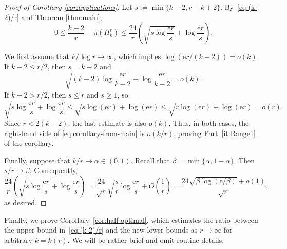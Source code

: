 \documentclass[10pt,a4paper]{article}
\numberwithin{equation}{section}
\theoremstyle{definition}
\theoremstyle{remark}
\newcommand{\hide}[1]{{\color{DarkGreen}#1}}
\renewcommand{\hide}[1]{}
\newcommand{\me}{\mathrm{e}}
\renewcommand{\longrightarrow}{\to}
\begin{document}
\begin{proof}[Proof of Corollary \ref{cor:applications}]
Let $s:=\min\{k-2,r-k+2\}$.
By~\eqref{eq:(k-2)/r} and Theorem \ref{thm:main},
\begin{equation}\label{eq:corollary-from-main}
0\le \frac{k-2}{r}-\pi(H_k^r)
\le \frac{24}{r}
\left(
\sqrt{s\log\frac{\me r}{s}}
+\log\frac{\me r}{s}
\right).
\end{equation}

\hide{
Suppose first that $k/\log r\to c\in(0,\infty)$. 
Then $(k-2)/\log r\to c$ and $k=o(r)$, so $s=k-2$ for all sufficiently large $r$. 
Moreover,
$$\frac{\log(\me r/(k-2))}{\log r}=1+\frac{1-\log(k-2)}{\log r}\longrightarrow 1.$$
It follows that
$$\frac{\log(\me r/(k-2))}{k-2}\longrightarrow \frac1c.$$
Multiplying \eqref{eq:corollary-from-main} by $r/(k-2)$, we obtain
$$0\le1-\frac{r\pi(H_k^r)}{k-2}\le24\left(\sqrt{\frac{\log(\me r/(k-2))}{k-2}}+\frac{\log(\me r/(k-2))}{k-2}\right).$$
Consequently,
$$0\le 1-\frac{r\pi(H_k^r)}{k-2}\le 24\left(c^{-1/2}+c^{-1}\right)+o(1),$$
which proves Part \textup{(i)} of Corollary \ref{cor:applications}.
}


We first assume that $k/\log r\to\infty$, which implies $\log(\me r/(k-2))=o(k)$.
If $k-2\le r/2$, then $s=k-2$ and
$$\sqrt{(k-2)\log\frac{\me r}{k-2}}+\log\frac{\me r}{k-2}=o(k).$$
If $k-2>r/2$, then $s\le r$ and $s\ge1$, so
$$\sqrt{s\log\frac{\me r}{s}}+\log\frac{\me r}{s}
\le \sqrt{s\log(\me r)}+\log(\me r)
\le \sqrt{r\log(\me r)}+\log(\me r)=o(r).$$
Since $r<2(k-2)$, the last estimate is also $o(k)$.
Thus, in both cases, the right-hand side of
\eqref{eq:corollary-from-main} is $o(k/r)$, proving
Part~\ref{it:Range1} of the corollary.

Finally, suppose that $k/r\to\alpha\in(0,1)$. Recall that $\beta=\min\{\alpha,1-\alpha\}$. 
Then $s/r\to\beta$.
Consequently,
$$
\frac{24}{r} \left(\sqrt{s\log\frac{\me r}{s}}+\log\frac{\me r}{s}\right)
=\frac{24}{\sqrt r}\sqrt{\frac{s}{r}\log\frac{\me r}{s}}+O\left(\frac1r\right)
=\frac{24\sqrt{\beta\log(\me /\beta)}+o(1)}{\sqrt r},$$
as desired.
\end{proof}

Finally, we prove Corollary~\ref{cor:half-optimal}, which estimates the ratio between the upper bound in~\eqref{eq:(k-2)/r} and the new lower bounds as $r\to\infty$ for arbitrary $k=k(r)$. 
We will be rather brief and omit routine details.
\end{document}
